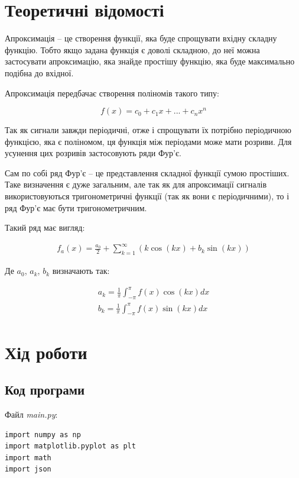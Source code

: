 \documentclass[oneside,14pt]{extarticle}
\begin{document}
\begin{normalsize}
	\section*{Теоретичні відомості}
	
	Апроксимація – це створення функції, яка буде спрощувати вхідну складну функцію. Тобто якщо задана функція є доволі складною, до неї можна застосувати апроксимацію, яка знайде простішу функцію, яка буде максимально подібна до вхідної.
	
	Апроксимація передбачає створення поліномів такого типу:
	
	\begin{equation}
		f(x)=c_0+c_1x+...+c_nx^n\nonumber
	\end{equation}
	
	Так як сигнали завжди періодичні, отже і спрощувати їх потрібно періодичною функцією, яка є поліномом, ця функція між періодами може мати розриви. Для усунення цих розривів застосовують ряди Фур’є.
	
	Сам по собі ряд Фур’є – це представлення складної функції сумою простіших. Таке визначення є дуже загальним, але так як для апроксимації сигналів використовуються тригонометричні функції (так як вони є періодичними), то і ряд Фур’є має бути тригонометричним.
	
	Такий ряд має вигляд:
	
	\begin{gather}
		f_a(x)=\frac{a_0}{2}+\sum_{k=1}^{\infty}(k\cos(kx)+b_k\sin(kx))\nonumber
	\end{gather}
	
	Де $a_0$, $a_k$, $b_k$ визначають так:
	
	\begin{gather}
		a_k=\frac{1}{\pi}\int_{-\pi}^{\pi}f(x)\cos(kx)dx\nonumber\\
		b_k=\frac{1}{\pi}\int_{-\pi}^{\pi}f(x)\sin(kx)dx\nonumber
	\end{gather}
	
	\section*{Хід роботи}	

	\subsection*{Код програми}
	Файл \textit{main.py}:
	{\small
		\begin{lstlisting}
import numpy as np
import matplotlib.pyplot as plt
import math
import json


\end{lstlisting}}
\end{normalsize}
\end{document}
